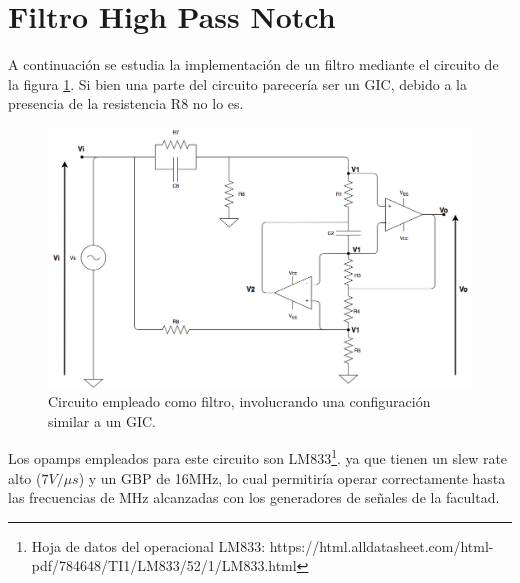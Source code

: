 
\section{Filtro High Pass Notch}

A continuaci\'on se estudia la implementaci\'on de un filtro mediante el circuito de la figura \ref{circ1}. Si bien una parte del circuito parecer\'ia ser un GIC, debido a la presencia de la resistencia R8 no lo es.

\begin{figure}[H] %
	\centering
	\includegraphics[scale=0.4]{../EJ1/circuito1.png}
	\caption{Circuito empleado como filtro, involucrando una configuraci\'on similar a un GIC.}
	\label{circ1}
\end{figure}

Los opamps empleados para este circuito son LM833\footnote{Hoja de datos del operacional LM833: https://html.alldatasheet.com/html-pdf/784648/TI1/LM833/52/1/LM833.html}. ya que tienen un slew rate alto ($7V/\mu s$) y un GBP de 16MHz, lo cual permitir\'ia operar correctamente hasta las frecuencias de MHz alcanzadas con los generadores de se\~nales de la facultad.













